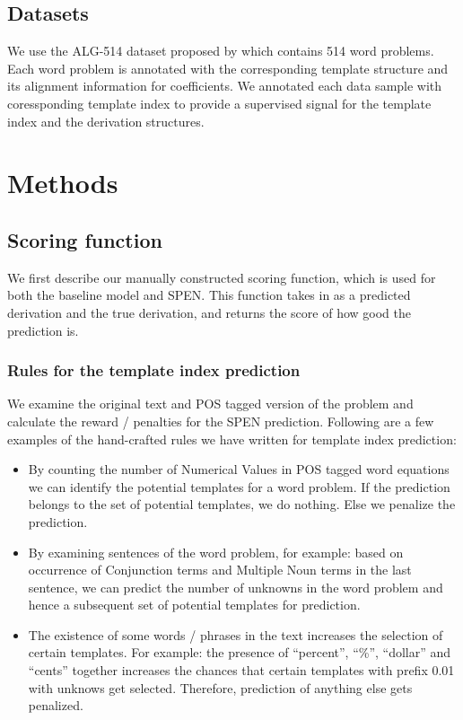 \documentclass[11pt,letterpaper]{article}
\begin{document}
\subsection{Datasets}
We use the ALG-514 dataset proposed by \cite{Kushman2014LearningTA} which contains 514 word problems. Each word problem is annotated with the corresponding template structure and its alignment information for coefficients. We annotated each data sample with coressponding template index to provide a supervised signal for the template index and the derivation structures. 
\section{Methods}
\subsection{Scoring function}
We first describe our manually constructed scoring function, which is used for both the baseline model and SPEN. This function takes in as a predicted derivation and the true derivation, and returns the score of how good the prediction is.
\subsubsection{Rules for the template index prediction}
We examine the original text and POS tagged version of the problem and calculate the reward / penalties for the SPEN prediction. Following are a few examples of the hand-crafted rules we have written for template index prediction:
\begin{itemize}
\item By counting the number of Numerical Values in POS tagged word equations we can identify the potential templates for a word problem. If the prediction belongs to the set of potential templates, we do nothing. Else we penalize the prediction.\\
\item By examining sentences of the word problem, for example: based on occurrence of Conjunction terms and Multiple Noun terms in the last sentence, we can predict the number of unknowns in the word problem and hence a subsequent set of potential templates for prediction.\\
\item The existence of some words / phrases in the text increases the selection of certain templates. For example: the presence of “percent”, “\%”, “dollar” and “cents” together increases the chances that certain templates with prefix 0.01 with unknows get selected. Therefore, prediction of anything else gets penalized.\\
\end{itemize}
%
\end{document}
